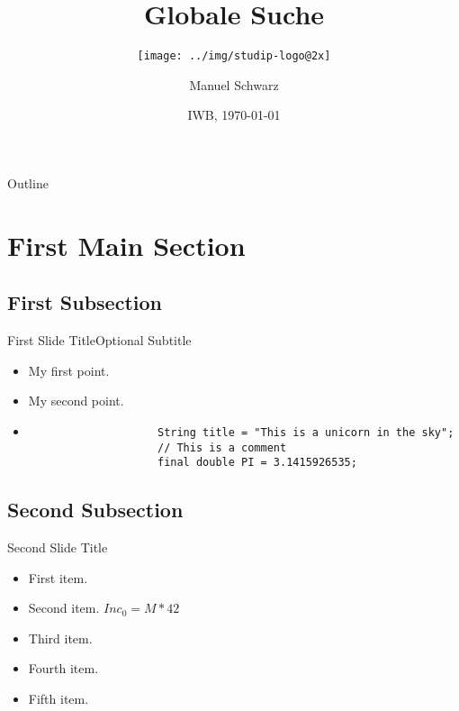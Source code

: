 \documentclass{beamer}
\title{Globale Suche}
\subtitle{\texttt{[image: ../img/studip-logo@2x]}}
\author{Manuel Schwarz}
\institute[Uni Osnabrück]{\inst{} virtUOS\\ Universität Osnabrück}
\date{IWB, \today}
\begin{document}
\begin{frame}
    \titlepage
\end{frame}


\begin{frame}{Outline}
    \tableofcontents
\end{frame}

\section{First Main Section}

\subsection{First Subsection}

\begin{frame}[fragile]{First Slide Title}{Optional Subtitle}
    \begin{itemize}
        \item {My first point.\pause}
        \item {My second point.\pause}
        \item[]{\begin{verbatim}
                    String title = "This is a unicorn in the sky";
                    // This is a comment
                    final double PI = 3.1415926535;
                \end{verbatim}
        }
    \end{itemize}
\end{frame}

\subsection{Second Subsection}

\begin{frame}{Second Slide Title}
    \begin{itemize}
        \item {First item.
            \pause %
        }
        \item {Second item. $Inc_{0} = M * 42$}
  \item<3-> {Third item.}
  \item<4-> {Fourth item.}
  \item<5-> {Fifth item. }
  \end{itemize}
\end{frame}
\end{document}
